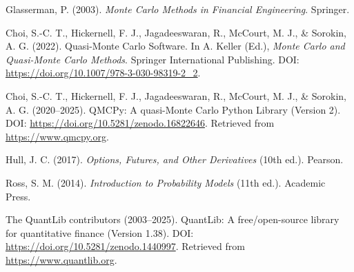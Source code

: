 \documentclass{article}
\begin{document}
\begin{thebibliography}{6}

Glasserman, P. (2003). \textit{Monte Carlo Methods in Financial Engineering}. Springer.

Choi, S.-C. T., Hickernell, F. J., Jagadeeswaran, R., McCourt, M. J., \& Sorokin, A. G. (2022).
Quasi-Monte Carlo Software. In A. Keller (Ed.), \textit{Monte Carlo and Quasi-Monte Carlo Methods}.
Springer International Publishing. DOI: \url{https://doi.org/10.1007/978-3-030-98319-2_2}.

Choi, S.-C. T., Hickernell, F. J., Jagadeeswaran, R., McCourt, M. J., \& Sorokin, A. G. (2020--2025).
QMCPy: A quasi-Monte Carlo Python Library (Version 2).
DOI: \url{https://doi.org/10.5281/zenodo.16822646}. 
Retrieved from \url{https://www.qmcpy.org}.

Hull, J. C. (2017). \textit{Options, Futures, and Other Derivatives} (10th ed.). Pearson.

Ross, S. M. (2014). \textit{Introduction to Probability Models} (11th ed.). Academic Press.

The QuantLib contributors (2003--2025). 
QuantLib: A free/open-source library for quantitative finance (Version 1.38).
DOI: \url{https://doi.org/10.5281/zenodo.1440997}. 
Retrieved from \url{https://www.quantlib.org}.
\end{thebibliography}
\end{document}
